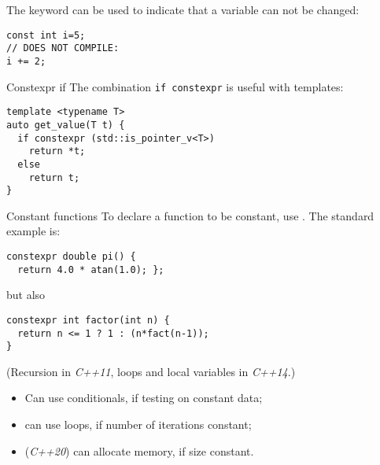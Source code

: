 The  keyword can be used to indicate that a
variable can not be changed:
\begin{lstlisting}
const int i=5;
// DOES NOT COMPILE:
i += 2;
\end{lstlisting}

\begin{block}{Constexpr if}
  \label{sl:constexpr-if}
  The combination \lstinline{if constexpr} is useful with templates:
\begin{lstlisting}
template <typename T>
auto get_value(T t) {
  if constexpr (std::is_pointer_v<T>)
    return *t;
  else
    return t;
}
\end{lstlisting}
\end{block}

\begin{block}{Constant functions}
  \label{sl:constexpr}
  To declare a function to be constant, use
  . The standard example is:
\begin{lstlisting}
constexpr double pi() {
  return 4.0 * atan(1.0); };
\end{lstlisting}
but also
\begin{lstlisting}
constexpr int factor(int n) {
  return n <= 1 ? 1 : (n*fact(n-1));
}
\end{lstlisting}
(Recursion in \emph{C++11},
loops and local variables in \emph{C++14}.)
\end{block}

\begin{itemize}
\item Can use conditionals, if testing on constant data;
\item can use loops, if number of iterations constant;
\item (\emph{C++20}) can allocate memory, if size constant.
\end{itemize}
